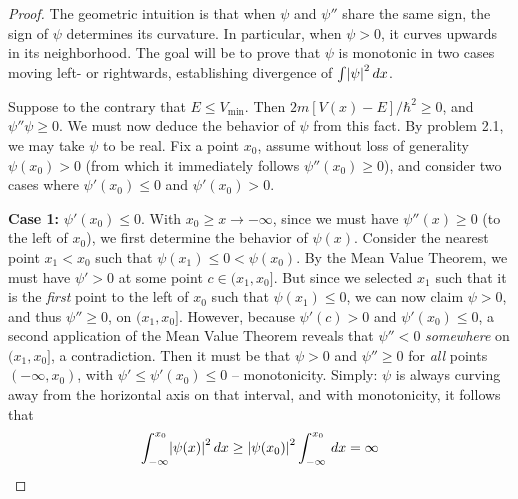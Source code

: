 \documentclass[a4paper]{article}
\begin{document}
\newpage
\begin{proof}[Proof]
	The geometric intuition is that when \( \psi \) and \( \psi'' \) share the same sign, the sign of \( \psi \) determines its curvature. In particular, when \( \psi > 0 \), it curves upwards in its neighborhood. The goal will be to prove that \( \psi \) is monotonic in two cases moving left- or rightwards, establishing divergence of \( \int \abs{\psi}^{2} \, dx \).

Suppose to the contrary that \( E \le V_{\text{min}} \). Then \( 2m \!\left[ V \!\left( x \right) - E \right] / \hbar^{2} \ge 0 \), and \( \psi''\psi \ge 0 \). We must now deduce the behavior of \( \psi \) from this fact. By problem 2.1, we may take \( \psi \) to be real. Fix a point \( x_{0} \), assume without loss of generality \( \psi \!\left( x_{0} \right) > 0 \) (from which it immediately follows \( \psi''\!\left( x_{0} \right) \ge 0 \)), and consider two cases where \( \psi'\!\left( x_{0} \right) \le 0 \) and \( \psi'\!\left( x_{0} \right) > 0 \).

\textbf{Case 1:} \( \psi'\!\left( x_{0} \right) \le 0 \). With \( x_{0} \ge x \rightarrow -\infty \), since we must have \( \psi''\!\left( x \right) \ge 0 \) (to the left of \( x_{0} \)), we first determine the behavior  of \( \psi \!\left( x \right) \). Consider the nearest point \( x_{1} < x_{0} \) such that \( \psi \!\left( x_{1} \right) \le 0 < \psi \!\left( x_{0} \right) \). By the Mean Value Theorem, we must have \( \psi' > 0 \) at some point \( c \in (x_{1},x_{0}] \). But since we selected \( x_{1} \) such that it is the \textit{first} point to the left of \( x_{0} \) such that \( \psi \!\left( x_{1} \right) \le 0 \), we can now claim \( \psi > 0 \), and thus \( \psi'' \ge 0 \), on \( (x_{1},x_{0}] \). However, because \( \psi'\!\left( c \right) > 0 \) and \( \psi'\!\left( x_{0} \right) \le 0 \), a second application of the Mean Value Theorem reveals that \( \psi'' < 0 \) \textit{somewhere} on \( (x_{1},x_{0}] \), a contradiction. Then it must be that \( \psi > 0 \) and \( \psi'' \ge 0 \) for \textit{all} points \( \!\left( -\infty,x_{0} \right) \), with \( \psi' \le \psi'\!\left( x_{0} \right) \le 0 \) -- monotonicity. Simply: \( \psi \) is always curving away from the horizontal axis on that interval, and with monotonicity, it follows that 
\[ 
	\int^{x_{0}}_{-\infty} \abs{\psi \!\left( x \right)}^{2} \, dx \ge \abs{\psi \!\left( x_{0} \right)}^{2}\int^{x_{0}}_{-\infty} \, dx  = \infty 
\]


\end{proof}
\end{document}
